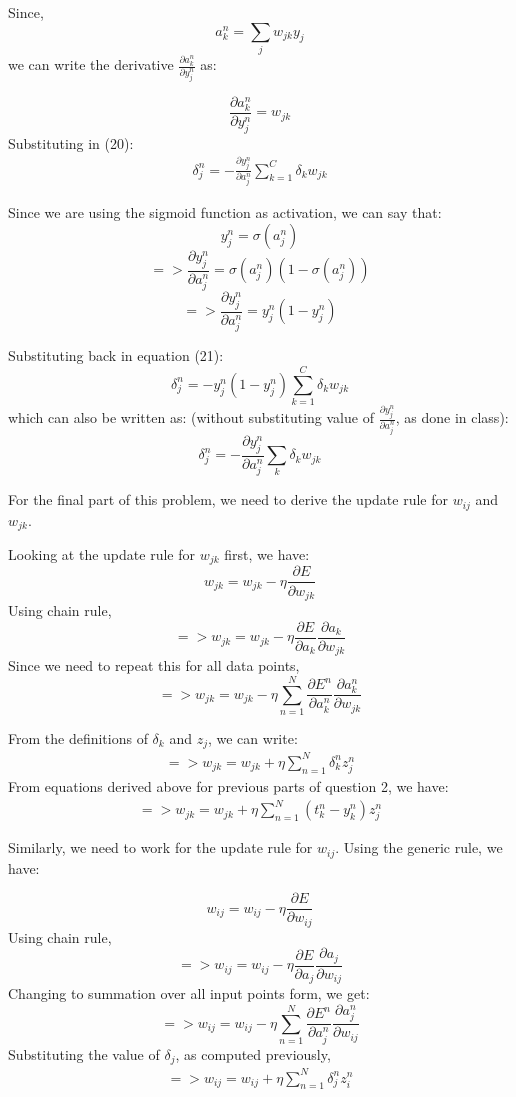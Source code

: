 \documentclass{article}
\begin{document}
Since, 
$$a^{n}_{k} = \sum_{j} w_{jk} y_{j}$$ 
we can write the derivative $\frac{\partial a_{k}^{n}}{\partial y_{j}^{n}}$ as:

$$\frac{\partial a_{k}^{n}}{\partial y_{j}^{n}} = w_{jk}$$
Substituting in (20):
\begin{align}
\delta_{j}^{n} = - \frac{\partial y_{j}^{n}}{\partial a_{j}^{n}} \sum_{k=1}^{C}  \delta_{k} w_{jk}
\end{align}

Since we are using the sigmoid function as activation, we can say that: 
$$ y_{j}^{n} = \sigma(a_{j}^{n})$$
$$=> \frac{\partial y_{j}^{n}}{\partial a_{j}^{n}} = \sigma(a_{j}^{n}) (1 - \sigma(a_{j}^{n})) $$
$$
=>\frac{\partial y_{j}^{n}}{\partial a_{j}^{n}} = y_{j}^{n}(1 - y_{j}^{n})$$

Substituting back in equation (21):
$$\delta_{j}^{n} = - y_{j}^{n}(1 - y_{j}^{n}) \sum_{k=1}^{C}  \delta_{k} w_{jk}$$
which can also be written as: (without substituting value of $\frac{\partial y_{j}^{n}}{\partial a_{j}^{n}}$, as done in class):
$$\delta_{j}^{n} = - \frac{\partial y_{j}^{n}}{\partial a_{j}^{n}} \sum_{k}\delta_{k} w_{jk}$$

For the final part of this problem, we need to derive the update rule for $w_{ij}$ and $w_{jk}$.

Looking at the update rule for $w_{jk}$ first, we have: 
$$
w_{jk} = w_{jk} - \eta \frac{\partial E}{\partial w_{jk}}
$$
Using chain rule,
$$
=> w_{jk} = w_{jk} - \eta \frac{\partial E}{\partial a_{k}} \frac{\partial a_{k}}{\partial w_{jk}}
$$
Since we need to repeat this for all data points,
$$
=> w_{jk} = w_{jk} - \eta \sum_{n=1}^{N} \frac{\partial E^{n}}{\partial a_{k}^{n}} \frac{\partial a_{k}^{n}}{\partial w_{jk}}
$$

From the definitions of $\delta_k$ and $z_j$, we can write:
\begin{align}
=> w_{jk} = w_{jk} + \eta \sum_{n=1}^{N} \delta_{k}^{n} z_{j}^{n}
\end{align}
From equations derived above for previous parts of question 2, we have:
\begin{align}
=> w_{jk} = w_{jk} + \eta \sum_{n=1}^{N} (t_{k}^{n} - y_{k}^{n}) z_{j}^{n}
\end{align}

Similarly, we need to work for the update rule for $w_{ij}$. Using the generic rule, we have:

$$
w_{ij} = w_{ij} - \eta \frac{\partial E}{\partial w_{ij}}
$$
Using chain rule, 
$$
=> w_{ij} = w_{ij} - \eta \frac{\partial E}{\partial a_{j}} \frac{\partial a_{j}}{\partial w_{ij}}
$$
Changing to summation over all input points form, we get:
$$
=> w_{ij} = w_{ij} - \eta \sum_{n=1}^{N} \frac{\partial E^{n}}{\partial a_{j}^{n}} \frac{\partial a_{j}^{n}}{\partial w_{ij}}
$$
Substituting the value of $\delta_j$, as computed previously,
\begin{align}
=> w_{ij} = w_{ij} + \eta \sum_{n=1}^{N} \delta_{j}^{n} z_{i}^{n}
\end{align}
\end{document}
